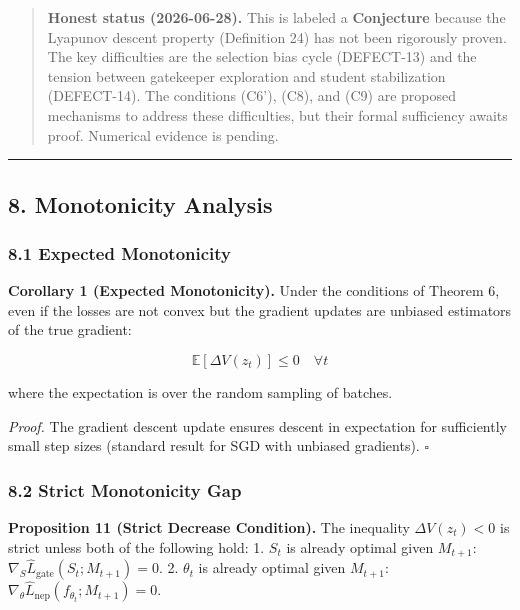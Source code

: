 \documentclass[
  12pt,
]{article}
\begin{document}
\begin{quote}
\textbf{Honest status (2026-06-28).} This is labeled a
\textbf{Conjecture} because the Lyapunov descent property (Definition
24) has not been rigorously proven. The key difficulties are the
selection bias cycle (DEFECT-13) and the tension between gatekeeper
exploration and student stabilization (DEFECT-14). The conditions (C6'),
(C8), and (C9) are proposed mechanisms to address these difficulties,
but their formal sufficiency awaits proof. Numerical evidence is
pending.
\end{quote}

\begin{center}\rule{0.5\linewidth}{0.5pt}\end{center}

\subsection{8. Monotonicity Analysis}\label{monotonicity-analysis}

\subsubsection{8.1 Expected Monotonicity}\label{expected-monotonicity}

\textbf{Corollary 1 (Expected Monotonicity).} Under the conditions of
Theorem 6, even if the losses are not convex but the gradient updates
are unbiased estimators of the true gradient:

\[\mathbb{E}[\Delta V(z_t)] \leq 0 \quad \forall t\]

where the expectation is over the random sampling of batches.

\emph{Proof.} The gradient descent update ensures descent in expectation
for sufficiently small step sizes (standard result for SGD with unbiased
gradients). \(\square\)

\subsubsection{8.2 Strict Monotonicity
Gap}\label{strict-monotonicity-gap}

\textbf{Proposition 11 (Strict Decrease Condition).} The inequality
\(\Delta V(z_t) < 0\) is strict unless both of the following hold: 1.
\(S_t\) is already optimal given \(M_{t+1}\):
\(\nabla_S \hat{L}_{\text{gate}}(S_t; M_{t+1}) = 0\). 2. \(\theta_t\) is
already optimal given \(M_{t+1}\):
\(\nabla_\theta \hat{L}_{\text{nep}}(f_{\theta_t}; M_{t+1}) = 0\).
\end{document}
